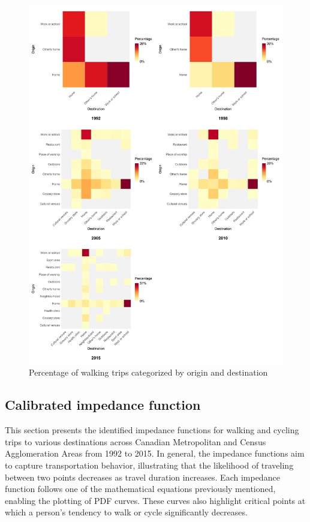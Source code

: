 \documentclass[preprint, 3p,
authoryear]{elsarticle} %
\begin{document}
\begin{figure}
\includegraphics[width=1\linewidth]{figures/cycling_hm_fig} \caption{Percentage of walking trips categorized by origin and destination}\label{fig:cycling-heatmap}
\end{figure}

\hypertarget{calibrated-impedance-function}{%
\subsection{Calibrated impedance
function}\label{calibrated-impedance-function}}

This section presents the identified impedance functions for walking and
cycling trips to various destinations across Canadian Metropolitan and
Census Agglomeration Areas from 1992 to 2015. In general, the impedance
functions aim to capture transportation behavior, illustrating that the
likelihood of traveling between two points decreases as travel duration
increases. Each impedance function follows one of the mathematical
equations previously mentioned, enabling the plotting of PDF curves.
These curves also highlight critical points at which a person's tendency
to walk or cycle significantly decreases.
\end{document}
